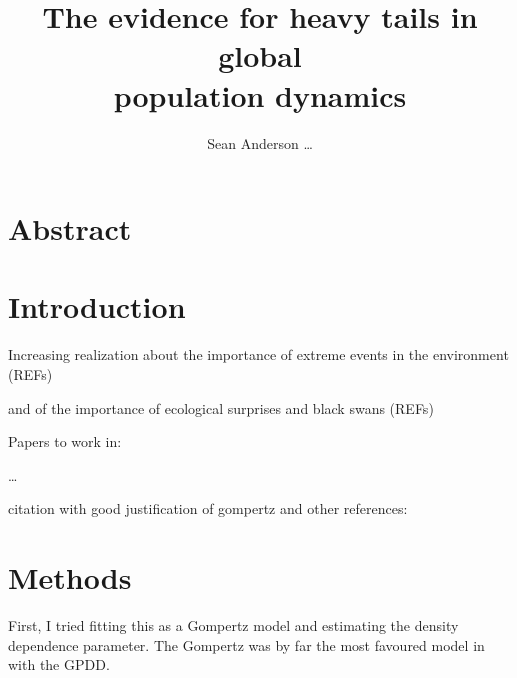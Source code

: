 \documentclass[10pt]{article}
\title{The evidence for heavy tails in global\\population dynamics}
\author{Sean Anderson \ldots}
\begin{document}


\maketitle

\section*{Abstract}


\section*{Introduction}

Increasing realization about the importance of extreme events in the environment (REFs)

and of the importance of ecological surprises and black swans (REFs)

Papers to work in:

\citep{inchausti2002,halley2002,inchausti2001}

\citep{jentsch2007}

\citep{ward2007}

\citep{garcia-carreras2011}
\citep{sornette2009}

\citep{nunez2012}

\citep{thompson2013}
\citep{beaugrand2012}
\citep{pine-iii2009}

\citep{doak2008}

\citep{smale2013}

\citep{easterling2000}
\citep{scheffer2003}
\citep{katz2005}

\citep{taleb2007}

\citep{vasseur2014}

\citep{vert-pre2013}
\citep{lindenmayer2010}

\ldots

citation with good justification of gompertz and other references: \citep{herrandoprez2014}

\section*{Methods}

First, I tried fitting this as a Gompertz model and estimating the density dependence parameter. The Gompertz was by far the most favoured model in \citet{brook2006} with the GPDD.
\end{document}
